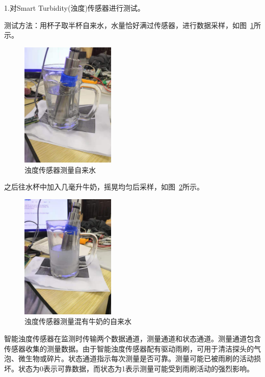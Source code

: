 1.对Smart Turbidity(浊度)传感器进行测试。

测试方法：用杯子取半杯自来水，水量恰好满过传感器，进行数据采样，如图~\ref{fig:浊度传感器测量自来水}所示。
\begin{figure}[ht]
    \centering
	\includegraphics[width=0.4\textwidth]{fig/浊度传感器测量自来水.png}
	\caption{浊度传感器测量自来水}
	\label{fig:浊度传感器测量自来水}
\end{figure}

之后往水杯中加入几毫升牛奶，摇晃均匀后采样，如图~\ref{fig:浊度传感器测量混有牛奶的自来水}所示。

\begin{figure}[ht]
    \centering
	\includegraphics[width=0.4\textwidth]{fig/浊度传感器测量混有牛奶的自来水.png}
	\caption{浊度传感器测量混有牛奶的自来水}
	\label{fig:浊度传感器测量混有牛奶的自来水}
\end{figure}

智能浊度传感器在监测时传输两个数据通道，测量通道和状态通道。测量通道包含传感器收集的测量数据。由于智能浊度传感器配有驱动雨刷，可用于清洁探头的气泡、微生物或碎片。状态通道指示每次测量是否可靠。测量可能已被雨刷的活动损坏。状态为0表示可靠数据，而状态为1表示测量可能受到雨刷活动的强烈影响。

